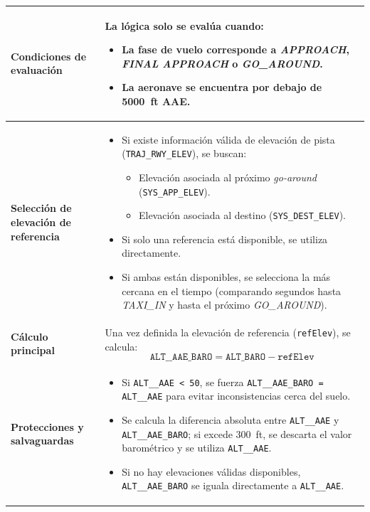 \documentclass[11pt,a4paper]{article}
\begin{document}
\begin{longtable}{p{5cm} p{9.5cm}}
		\textbf{Condiciones de evaluación} &
		La lógica solo se evalúa cuando:
		\begin{itemize}
			\item La fase de vuelo corresponde a \textit{APPROACH}, \textit{FINAL APPROACH} o \textit{GO\_AROUND}.
			\item La aeronave se encuentra por debajo de \SI{5000}{ft} AAE.
		\end{itemize}
		\\ \hline
		
		\textbf{Selección de elevación de referencia} &
		\begin{itemize}
			\item Si existe información válida de elevación de pista (\texttt{TRAJ\_RWY\_ELEV}), se buscan:
			\begin{itemize}
				\item Elevación asociada al próximo \textit{go-around} (\texttt{SYS\_APP\_ELEV}).
				\item Elevación asociada al destino (\texttt{SYS\_DEST\_ELEV}).
			\end{itemize}
			\item Si solo una referencia está disponible, se utiliza directamente.
			\item Si ambas están disponibles, se selecciona la más cercana en el tiempo (comparando segundos hasta \textit{TAXI\_IN} y hasta el próximo \textit{GO\_AROUND}).
		\end{itemize}
		\\
		
		\textbf{Cálculo principal} &
		Una vez definida la elevación de referencia (\texttt{refElev}), se calcula:
		\[
		\texttt{ALT\_\_AAE\_BARO} = \texttt{ALT\_BARO} - \texttt{refElev}
		\]
		\\ \hline
		
		\textbf{Protecciones y salvaguardas} &
		\begin{itemize}
			\item Si \texttt{ALT\_\_AAE < 50}, se fuerza \texttt{ALT\_\_AAE\_BARO = ALT\_\_AAE} para evitar inconsistencias cerca del suelo.
			\item Se calcula la diferencia absoluta entre \texttt{ALT\_\_AAE} y \texttt{ALT\_\_AAE\_BARO}; si excede \SI{300}{ft}, se descarta el valor barométrico y se utiliza \texttt{ALT\_\_AAE}.
			\item Si no hay elevaciones válidas disponibles, \texttt{ALT\_\_AAE\_BARO} se iguala directamente a \texttt{ALT\_\_AAE}.
		\end{itemize}
		\\ \hline
		

\end{longtable}
\end{document}
